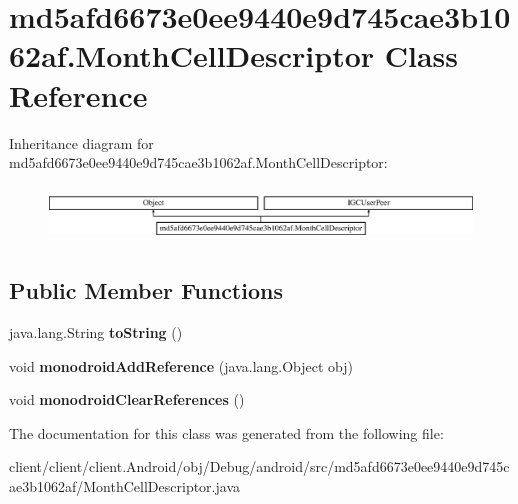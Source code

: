 \hypertarget{classmd5afd6673e0ee9440e9d745cae3b1062af_1_1MonthCellDescriptor}{}\section{md5afd6673e0ee9440e9d745cae3b1062af.\+Month\+Cell\+Descriptor Class Reference}
\label{classmd5afd6673e0ee9440e9d745cae3b1062af_1_1MonthCellDescriptor}
Inheritance diagram for md5afd6673e0ee9440e9d745cae3b1062af.\+Month\+Cell\+Descriptor\+:\begin{figure}[H]
\begin{center}
\leavevmode
\includegraphics[height=1.469816cm]{classmd5afd6673e0ee9440e9d745cae3b1062af_1_1MonthCellDescriptor}
\end{center}
\end{figure}
\subsection*{Public Member Functions}
\begin{DoxyCompactItemize}
\item 
\hypertarget{classmd5afd6673e0ee9440e9d745cae3b1062af_1_1MonthCellDescriptor_ae5035d7d18c974858bec849a7c7d09c2}{}java.\+lang.\+String {\bfseries to\+String} ()\label{classmd5afd6673e0ee9440e9d745cae3b1062af_1_1MonthCellDescriptor_ae5035d7d18c974858bec849a7c7d09c2}

\item 
\hypertarget{classmd5afd6673e0ee9440e9d745cae3b1062af_1_1MonthCellDescriptor_adbe089170292a9a84ba38b2b88d8c490}{}void {\bfseries monodroid\+Add\+Reference} (java.\+lang.\+Object obj)\label{classmd5afd6673e0ee9440e9d745cae3b1062af_1_1MonthCellDescriptor_adbe089170292a9a84ba38b2b88d8c490}

\item 
\hypertarget{classmd5afd6673e0ee9440e9d745cae3b1062af_1_1MonthCellDescriptor_a62cf7db4a39e071a8005a44bd78e14a9}{}void {\bfseries monodroid\+Clear\+References} ()\label{classmd5afd6673e0ee9440e9d745cae3b1062af_1_1MonthCellDescriptor_a62cf7db4a39e071a8005a44bd78e14a9}

\end{DoxyCompactItemize}


The documentation for this class was generated from the following file\+:\begin{DoxyCompactItemize}
\item 
client/client/client.\+Android/obj/\+Debug/android/src/md5afd6673e0ee9440e9d745cae3b1062af/Month\+Cell\+Descriptor.\+java\end{DoxyCompactItemize}
